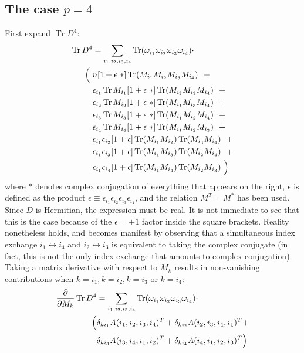 \documentclass[12pt,a4paper]{article}
\DeclareMathOperator{\Tr}{Tr}
\begin{document}
\subsection{The case $p=4$}
First expand $\Tr D^4$:
\begin{align}\label{eq:trd4}
\Tr D^4 &= \sum_{i_1, i_2, i_3, i_4} \Tr (\omega_{i_1} \omega_{i_2} \omega_{i_3} \omega_{i_4}) \cdot \notag \\
\Big( \ &n [1+\epsilon \ *] \Tr (M_{i_1} M_{i_2} M_{i_3} M_{i_4})  \ \  + \notag \\
&\epsilon_{i_1} \Tr M_{i_1} [1 + \epsilon \ *] \Tr ( M_{i_2} M_{i_3} M_{i_4})  \ \  + \notag \\
&\epsilon_{i_2} \Tr M_{i_2} [1  + \epsilon \ *] \Tr (M_{i_1} M_{i_3} M_{i_4}) \ \  + \notag \\
&\epsilon_{i_3} \Tr M_{i_3} [1 + \epsilon \ *] \Tr (M_{i_1} M_{i_2} M_{i_4})  \ \  + \notag \\
&\epsilon_{i_4} \Tr M_{i_4} [1 + \epsilon \ *] \Tr (M_{i_1} M_{i_2} M_{i_3})  \ \  + \notag \\
&\epsilon_{i_1} \epsilon_{i_2} [1 + \epsilon] \Tr (M_{i_1} M_{i_2} ) \Tr (M_{i_3} M_{i_4})   \ \  + \notag \\
&\epsilon_{i_1} \epsilon_{i_3} [1 + \epsilon] \Tr (M_{i_1} M_{i_3}) \Tr (M_{i_2} M_{i_4})   \ \  + \notag \\
&\epsilon_{i_1} \epsilon_{i_4} [1 + \epsilon] \Tr (M_{i_1} M_{i_4}) \Tr (M_{i_2} M_{i_3})   \ \Big)
\end{align}
where $*$ denotes complex conjugation of everything that appears on the right, $\epsilon$ is defined as the product $\epsilon \equiv \epsilon_{i_1}\epsilon_{i_2}\epsilon_{i_3}\epsilon_{i_4}$, and the relation $M^T = M^*$ has been used. Since $D$ is Hermitian, the expression must be real. It is not immediate to see that this is the case because of the $\epsilon = \pm 1$ factor inside the square brackets. Reality nonetheless holds, and becomes manifest by observing that a simultaneous index exchange $i_1 \leftrightarrow i_4$ and $i_2 \leftrightarrow i_3$ is equivalent to taking the complex conjugate (in fact, this is not the only index exchange that amounts to complex conjugation). \newline
Taking a matrix derivative with respect to $M_k$ results in non-vanishing contributions when $k=i_1, k=i_2, k=i_3$ or $k=i_4$:
\begin{align}
\frac{\partial}{\partial M_k} \Tr D^4 &= \sum_{i_1, i_2, i_3, i_4} \Tr (\omega_{i_1} \omega_{i_2} \omega_{i_3} \omega_{i_4}) \cdot \notag \\
\Big( &\delta_{ki_1} A(i_1, i_2, i_3, i_4)^T + \delta_{ki_2} A(i_2, i_3, i_4, i_1)^T + \notag \\
&\delta_{ki_3} A(i_3, i_4, i_1, i_2)^T + \delta_{ki_4} A(i_4, i_1, i_2, i_3)^T \Big)
\end{align}
\end{document}
